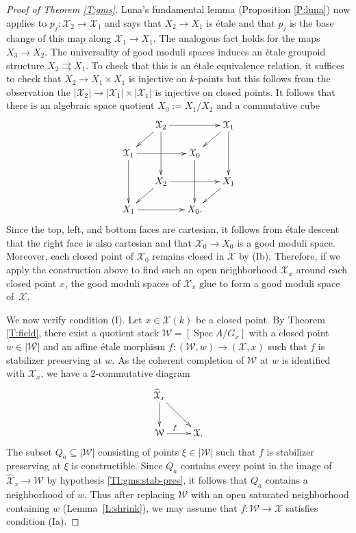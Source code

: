 \documentclass[a4paper]{amsart}
\theoremstyle{plain}
\theoremstyle{definition}
\theoremstyle{remark}
\numberwithin{equation}{section}
\newcommand\cW{\mathcal{W}}
\newcommand\cX{\mathcal{X}}
\newcommand\co{\colon}
\DeclareMathOperator{\Spec}{Spec}
\renewcommand{\hat}{\widehat}
\newcommand{\itemref}[1]{\eqref{#1}}
\begin{document}
\begin{proof}[Proof of Theorem \ref{T:gms}]
Luna's fundamental lemma (Proposition \ref{P:luna}) now applies to $p_j\co \cX_2\to \cX_1$ and says that $X_2 \to X_1$ is \'etale and that $p_j$ is the base change of this map along $\cX_1 \to X_1$.  The analogous fact holds for the maps $X_3 \to X_2$.  The universality of good moduli spaces induces an \'etale groupoid structure $X_2 \rightrightarrows X_1$.  To check that this is an \'etale equivalence relation, it suffices to check that $X_2 \to X_1 \times X_1$ is injective on $k$-points but this follows from the observation the $|\cX_2| \to |\cX_1| \times |\cX_1|$ is injective on closed points.  It follows that there is an algebraic space quotient $X_0 := X_1/X_2$ and a commutative cube 
\[
\xymatrix@=15pt{
				&\cX_2 \ar[rr] \ar[dd] \ar[dl]			&				& \cX_1 \ar[dd] \ar[dl] \\
\cX_1 \ar[rr] \ar[dd] &						& \cX_0 \ar[dd]	& \\
				& X_2 \ar[rr] \ar[dl]				& 				& X_1 \ar[dl]  \\
X_1  \ar[rr]	&							& X_0. 		&
}
\]
Since the top, left, and bottom faces are cartesian, it follows from \'etale descent that the right face is also cartesian and that $\cX_0 \to X_0$ is a good moduli space.  Moreover, each closed point of $\cX_0$ remains closed in $\cX$ by (Ib).  Therefore, if we apply the construction above to find such an open neighborhood $\cX_x$ around each closed point $x$, the good moduli spaces of $\cX_x$ glue to form a good moduli space of~$\cX$.

We now verify condition (I).  Let $x \in \cX(k)$ be a closed point.  By Theorem \ref{T:field}, there
exist a quotient stack $\cW = [\Spec A / G_x]$ with a closed point $w \in |\cW|$ and an affine \'etale morphism $f \co (\cW, w) \to (\cX, x)$ such that $f$ is stabilizer preserving at $w$.
 As the coherent completion of $\cW$ at $w$ is identified with $\hat{\cX}_x$, we have a 2-commutative diagram
\begin{equation} \label{E:completion}
\begin{split}
\xymatrix{
\hat{\cX}_x \ar[d] \ar[rd]	&  \\
\cW \ar[r]^(.4){f}		& \cX.
} \end{split}
\end{equation}
The subset $Q_a\subseteq |\cW|$ consisting of points $\xi \in |\cW|$ such that
$f$ is stabilizer preserving at $\xi$ is constructible.
Since $Q_a$ contains every point in the image of $\hat{\cX}_x \to \cW$ by
hypothesis \itemref{TI:gms:stab-pres}, it follows that $Q_a$ contains a
neighborhood of $w$. Thus after replacing $\cW$ with an open saturated
neighborhood containing $w$ (Lemma~\ref{L:shrink}), we may assume that $f \co
\cW \to \cX$ satisfies condition (Ia).


\end{proof}
\end{document}

